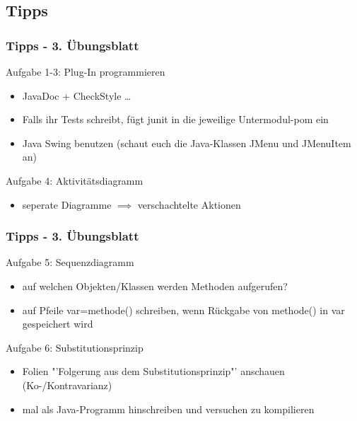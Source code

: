 \documentclass[18pt]{beamer}
\begin{document}
	\subsection{Tipps}
	\begin{frame}
		\frametitle{Tipps - 3. Übungsblatt}
			\begin{exampleblock}{Aufgabe 1-3: Plug-In programmieren}
				\begin{itemize}
					\pause
					\item JavaDoc + CheckStyle \dots
					\item Falls ihr Tests schreibt, fügt junit in die jeweilige Untermodul-pom ein
					\item Java Swing benutzen (schaut euch die Java-Klassen JMenu und JMenuItem an)
				\end{itemize}
			\end{exampleblock}
			\pause
			\begin{exampleblock}{Aufgabe 4: Aktivitätsdiagramm}
				\begin{itemize}
					\pause 
					\item seperate Diagramme $\implies$ verschachtelte Aktionen
				\end{itemize}
			\end{exampleblock}
	\end{frame}

	\begin{frame}
		\frametitle{Tipps - 3. Übungsblatt}
			\begin{exampleblock}{Aufgabe 5: Sequenzdiagramm}
				\begin{itemize}
					\pause
					\item auf welchen Objekten/Klassen werden Methoden aufgerufen?
					\item auf Pfeile var=methode() schreiben, wenn Rückgabe von methode() in var gespeichert wird
				\end{itemize}
			\end{exampleblock}
			\pause
			\begin{exampleblock}{Aufgabe 6: Substitutionsprinzip}
				\begin{itemize}
					\pause
					\item Folien "'Folgerung aus dem Substitutionsprinzip"' anschauen (Ko-/Kontravarianz)
					\item mal als Java-Programm hinschreiben und versuchen zu kompilieren
				\end{itemize}
			\end{exampleblock}
	\end{frame}
	
\end{document}
